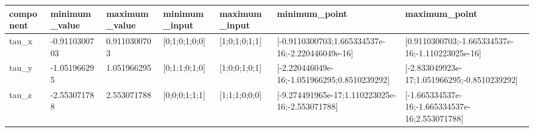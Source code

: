\begin{tabular}{@{}lllllll@{}}
\toprule
component & minimum\_value & maximum\_value & minimum\_input & maximum\_input & minimum\_point & maximum\_point \\
\midrule
tau\_x & -0.9110300703 & 0.9110300703 & [0;1;0;1;0;0] & [1;0;1;0;1;1] & [-0.9110300703;1.665334537e-16;-2.220446049e-16] & [0.9110300703;-1.665334537e-16;-1.110223025e-16] \\
tau\_y & -1.051966295 & 1.051966295 & [0;1;1;0;1;0] & [1;0;0;1;0;1] & [-2.220446049e-16;-1.051966295;0.8510239292] & [-2.833049923e-17;1.051966295;-0.8510239292] \\
tau\_z & -2.553071788 & 2.553071788 & [0;0;0;1;1;1] & [1;1;1;0;0;0] & [-9.274491965e-17;1.110223025e-16;-2.553071788] & [-1.665334537e-16;-1.665334537e-16;2.553071788] \\
\bottomrule
\end{tabular}

